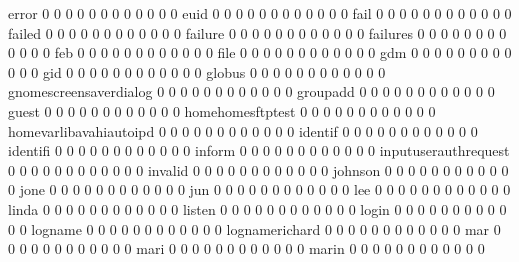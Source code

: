 \documentclass[compress,8pt]{beamer}
\begin{document}
\begin{frame}
\begin{Schunk}
  error                                     0  0  0  0  0  0  0  0  0  0  0  0
  euid                                      0  0  0  0  0  0  0  0  0  0  0  0
  fail                                      0  0  0  0  0  0  0  0  0  0  0  0
  failed                                    0  0  0  0  0  0  0  0  0  0  0  0
  failure                                   0  0  0  0  0  0  0  0  0  0  0  0
  failures                                  0  0  0  0  0  0  0  0  0  0  0  0
  feb                                       0  0  0  0  0  0  0  0  0  0  0  0
  file                                      0  0  0  0  0  0  0  0  0  0  0  0
  gdm                                       0  0  0  0  0  0  0  0  0  0  0  0
  gid                                       0  0  0  0  0  0  0  0  0  0  0  0
  globus                                    0  0  0  0  0  0  0  0  0  0  0  0
  gnomescreensaverdialog                    0  0  0  0  0  0  0  0  0  0  0  0
  groupadd                                  0  0  0  0  0  0  0  0  0  0  0  0
  guest                                     0  0  0  0  0  0  0  0  0  0  0  0
  homehomesftptest                          0  0  0  0  0  0  0  0  0  0  0  0
  homevarlibavahiautoipd                    0  0  0  0  0  0  0  0  0  0  0  0
  identif                                   0  0  0  0  0  0  0  0  0  0  0  0
  identifi                                  0  0  0  0  0  0  0  0  0  0  0  0
  inform                                    0  0  0  0  0  0  0  0  0  0  0  0
  inputuserauthrequest                      0  0  0  0  0  0  0  0  0  0  0  0
  invalid                                   0  0  0  0  0  0  0  0  0  0  0  0
  johnson                                   0  0  0  0  0  0  0  0  0  0  0  0
  jone                                      0  0  0  0  0  0  0  0  0  0  0  0
  jun                                       0  0  0  0  0  0  0  0  0  0  0  0
  lee                                       0  0  0  0  0  0  0  0  0  0  0  0
  linda                                     0  0  0  0  0  0  0  0  0  0  0  0
  listen                                    0  0  0  0  0  0  0  0  0  0  0  0
  login                                     0  0  0  0  0  0  0  0  0  0  0  0
  logname                                   0  0  0  0  0  0  0  0  0  0  0  0
  lognamerichard                            0  0  0  0  0  0  0  0  0  0  0  0
  mar                                       0  0  0  0  0  0  0  0  0  0  0  0
  mari                                      0  0  0  0  0  0  0  0  0  0  0  0
  marin                                     0  0  0  0  0  0  0  0  0  0  0  0

\end{Schunk}
\end{frame}
\end{document}

